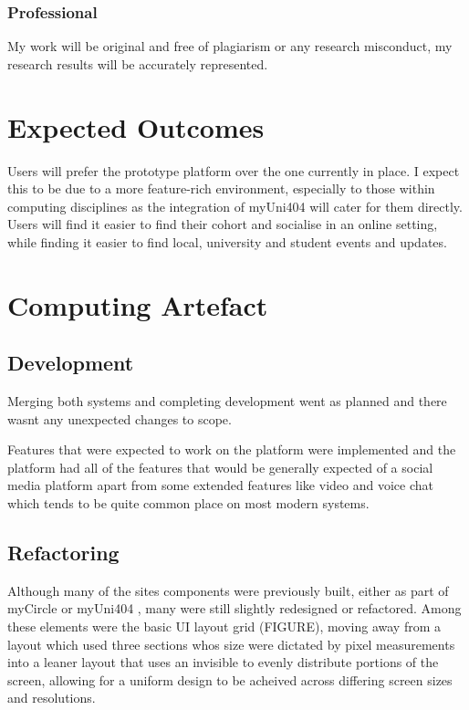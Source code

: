 \documentclass[lettersize,journal]{IEEEtran}
\begin{document}
	\subsubsection{Professional}
	My work will be original and free of plagiarism or any research misconduct, my research results will be accurately represented.

\section{Expected Outcomes}


 Users will prefer the prototype platform over the one currently in place. I expect this to be due to a more
 feature-rich environment, 
 especially to those within computing disciplines as the integration of myUni404 will cater for them directly. Users will find it easier to find their 
 cohort and socialise in an online setting, while finding it easier to find local, university and student events and updates.


 \section{Computing Artefact}
 \subsection{Development}
 Merging both systems and completing development went as planned and there wasnt any unexpected changes to scope.

 Features that were expected to work on the platform were implemented and the platform had all of the features that would be generally expected of a social media platform 
 apart from some extended features like video and voice chat which tends to be quite common place on most modern systems.


 \subsection{Refactoring}
 Although many of the sites components were previously built, either as part of myCircle \cite{myCircle} or myUni404 \cite{myUni404}, many were still slightly redesigned or refactored. Among these elements were the basic UI layout grid (FIGURE), moving away from a layout which used three sections whos size were dictated by pixel measurements into a leaner layout that uses an invisible 
 to evenly distribute portions of the screen, allowing for a uniform design to be acheived across differing screen sizes and resolutions.
\end{document}
